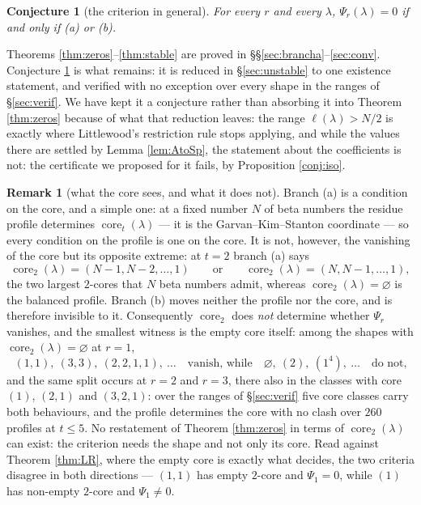 \documentclass[11pt,reqno]{amsart}
\theoremstyle{plain}
\newtheorem{conjecture}[theorem]{Conjecture}
\theoremstyle{definition}
\newtheorem{remark}[theorem]{Remark}
\newcommand{\core}{\operatorname{core}}
\begin{document}
\begin{conjecture}[the criterion in general]\label{conj:crit}
For every $r$ and every $\lambda$, $\Psi_r(\lambda)=0$ if and only if {\rm(a)} or {\rm(b)}.
\end{conjecture}

Theorems \ref{thm:zeros}--\ref{thm:stable} are proved in \S\S\ref{sec:brancha}--\ref{sec:conv}.
Conjecture \ref{conj:crit} is what remains: it is reduced in \S\ref{sec:unstable} to one existence
statement, and verified with no exception over every shape in the ranges of \S\ref{sec:verif}. We
have kept it a conjecture rather than absorbing it into Theorem \ref{thm:zeros} because of what that
reduction leaves: the range $\ell(\lambda)>N/2$ is exactly where Littlewood's restriction rule stops
applying, and while the values there are settled by Lemma \ref{lem:AtoSp}, the statement about the
coefficients is not: the certificate we proposed for it fails, by Proposition \ref{conj:iso}.

\begin{remark}[what the core sees, and what it does not]\label{rem:core}
Branch (a) is a condition on the core, and a simple one: at a fixed number $N$ of beta numbers the
residue profile determines $\core_t(\lambda)$ --- it is the Garvan--Kim--Stanton coordinate
\cite{GKS90} --- so every condition on the profile is one on the core. It is not, however, the
vanishing of the core but its opposite extreme: at $t=2$ branch (a) says
\[
\core_2(\lambda)=(N-1,N-2,\dots,1)\qquad\text{or}\qquad\core_2(\lambda)=(N,N-1,\dots,1),
\]
the two largest $2$-cores that $N$ beta numbers admit, whereas $\core_2(\lambda)=\varnothing$ is the
balanced profile. Branch (b) moves neither the profile nor the core, and is therefore invisible to
it. Consequently $\core_2$ does \emph{not} determine whether $\Psi_r$ vanishes, and the smallest
witness is the empty core itself: among the shapes with $\core_2(\lambda)=\varnothing$ at $r=1$,
\[
(1,1),\ (3,3),\ (2,2,1,1),\ \dots\quad\text{vanish, while}\quad
\varnothing,\ (2),\ (1^4),\ \dots\quad\text{do not,}
\]
and the same split occurs at $r=2$ and $r=3$, there also in the classes with core $(1)$, $(2,1)$ and
$(3,2,1)$: over the ranges of \S\ref{sec:verif} five core classes carry both behaviours, and the
profile determines the core with no clash over $260$ profiles at $t\le5$. No restatement of Theorem
\ref{thm:zeros} in terms of $\core_2(\lambda)$ can exist: the
criterion needs the shape and not only its core. Read against Theorem \ref{thm:LR}, where the empty
core is exactly what decides, the two criteria disagree in both directions --- $(1,1)$ has empty
$2$-core and $\Psi_1=0$, while $(1)$ has non-empty $2$-core and $\Psi_1\ne0$.
\end{remark}
\end{document}
